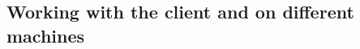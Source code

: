 


\subsection{\jbclient}


\subsection{\gdagent}
 

\subsection{Working with the client and \gdagent on different machines}



